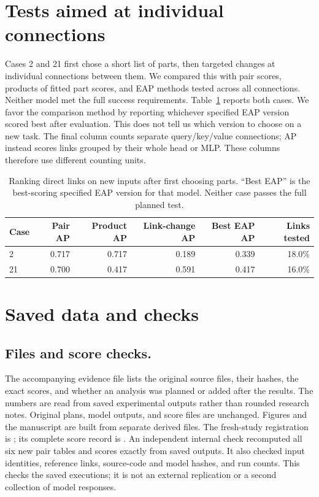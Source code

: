 \documentclass[11pt,letterpaper]{article}
\begin{document}
\section*{Tests aimed at individual connections}
Cases 2 and 21 first chose a short list of parts, then targeted changes at
individual connections between them. We compared this with pair scores,
products of fitted part scores, and EAP methods tested across all connections.
Neither model met the full success requirements. Table~\ref{tab:directed}
reports both cases. We favor the comparison method by reporting whichever
specified EAP version scored best after evaluation. This does not tell us
which version to choose on a new task. The final column counts separate
query/key/value connections; AP instead scores links grouped by their whole
head or MLP. These columns therefore use different counting units.

\begin{table}[H]
\singlespacing\centering\footnotesize
\caption{Ranking direct links on new inputs after first choosing parts.
``Best EAP'' is the best-scoring specified EAP version for that model.
Neither case passes the full planned test.}
\label{tab:directed}
\begin{tabular}{lrrrrr}
\toprule
Case & Pair AP & Product AP & Link-change AP & Best EAP AP & Links tested \\
\midrule
2 & 0.717 & 0.717 & 0.189 & 0.339 & 18.0\% \\
21 & 0.700 & 0.417 & 0.591 & 0.417 & 16.0\% \\
\bottomrule
\end{tabular}

\end{table}

\section*{Saved data and checks}
\subsection*{Files and score checks.}
The accompanying evidence file lists the original source files, their hashes,
the exact scores, and whether an analysis was planned or added after the
results. The numbers are read from saved experimental outputs rather than
rounded research notes. Original plans, model outputs, and score files are
unchanged. Figures and the manuscript are built from separate derived files.
The fresh-study registration is
;
its complete score record is
.
An independent internal check recomputed all six new pair tables and scores
exactly from saved outputs. It also checked input identities, reference links,
source-code and model hashes, and run counts. This checks the saved executions;
it is not an external replication or a second collection of model responses.
\end{document}
